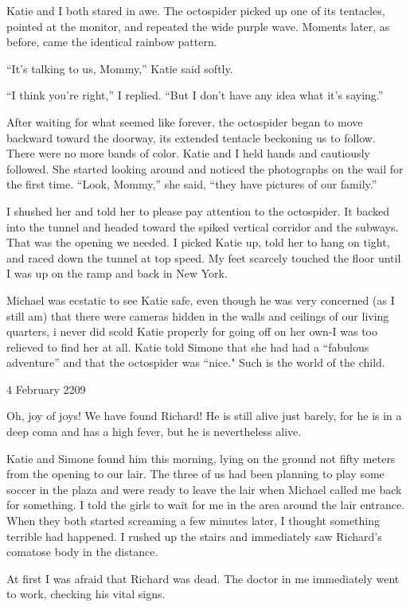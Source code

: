 \documentclass[]{article}
\begin{document}
{	Katie and I both stared in awe.  The octospider picked up one of its tentacles, pointed at the monitor, and repeated the wide purple wave.  Moments later, as before, came the identical rainbow pattern.
	
	“It’s talking to us, Mommy,” Katie said softly.
	
	“I think you’re right,” I replied.  “But I don’t have any idea what it’s saying.”
	
	After waiting for what seemed like forever, the octospider began to move backward toward the doorway, its extended tentacle beckoning us to follow.  There were no more bands of color.  Katie and I held hands and cautiously followed.  She started looking around and noticed the photographs on the wail for the first time.  “Look, Mommy,” she said, “they have pictures of our family.”
	
	I shushed her and told her to please pay attention to the octospider.  It backed into the tunnel and headed toward the spiked vertical corridor and the subways.  That was the opening we needed.  I picked Katie up, told her to hang on tight, and raced down the tunnel at top speed.  My feet scarcely touched the floor until I was up on the ramp and back in New York.
	
	Michael was ecstatic to see Katie safe, even though he was very concerned (as I still am) that there were cameras hidden in the walls and ceilings of our living quarters, i never did scold Katie properly for going off on her own-I was too relieved to find her at all.  Katie told Simone that she had had a “fabulous adventure” and that the octospider was “nice."  Such is the world of the child.
	
	4 February 2209
	
	Oh, joy of joys! We have found Richard! He is still alive just barely, for he is in a deep coma and has a high fever, but he is nevertheless alive.
	
	Katie and Simone found him this morning, lying on the ground not fifty meters from the opening to our lair.  The three of us had been planning to play some soccer in the plaza and were ready to leave the lair when Michael called me back for something.  I told the girls to wait for me in the area around the lair entrance.  When they both started screaming a few minutes later, I thought something terrible had happened.  I rushed up the stairs and immediately saw Richard’s comatose body in the distance.
	
	At first I was afraid that Richard was dead.  The doctor in me immediately went to work, checking his vital signs.
	
}
\end{document}
